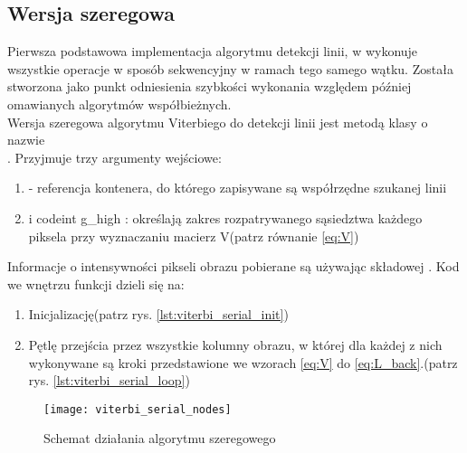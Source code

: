 \documentclass[document.tex]{subfiles}
\begin{document}
\subsection{Wersja szeregowa}
\indent Pierwsza podstawowa implementacja algorytmu detekcji linii, w wykonuje wszystkie operacje w sposób sekwencyjny  w ramach tego samego wątku. Została stworzona jako punkt odniesienia szybkości wykonania względem później omawianych algorytmów współbieżnych.
\\
\indent Wersja szeregowa algorytmu Viterbiego do detekcji linii jest metodą klasy  o nazwie
\\ . Przyjmuje trzy argumenty wejściowe:
\begin{enumerate}
    \item {} - referencja kontenera, do którego zapisywane są współrzędne szukanej linii
    \item {} i code{int g\_high} : określają zakres rozpatrywanego sąsiedztwa każdego piksela przy
    wyznaczaniu macierz V(patrz równanie \ref{eq:V})
\end{enumerate}
Informacje o intensywności pikseli obrazu pobierane są używając składowej .
\clearpage
Kod we wnętrzu funkcji dzieli się na:
\begin{enumerate}
    \item Inicjalizację(patrz rys. \ref{lst:viterbi_serial_init})
    \item Pętlę przejścia przez wszystkie kolumny obrazu, w której dla każdej z nich wykonywane są kroki przedstawione we wzorach \ref{eq:V} do \ref{eq:L_back}.(patrz rys. \ref{lst:viterbi_serial_loop})
\end{enumerate}

 

 

\begin{figure}[h]
\texttt{[image: viterbi\_serial\_nodes]}
\caption{Schemat działania algorytmu szeregowego}
\label{fig:viterbi_serial_nodes}
\end{figure}

\clearpage
\end{document}
